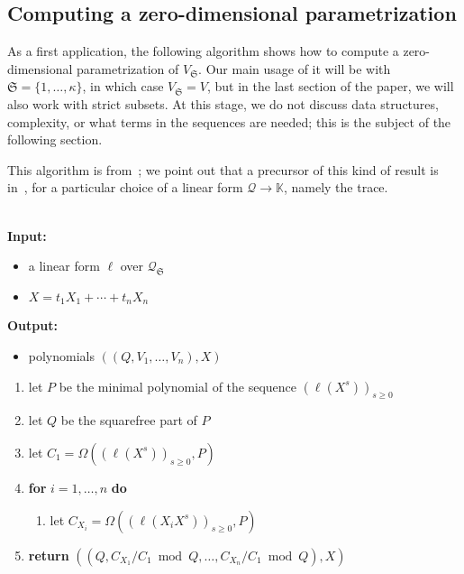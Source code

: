 \documentclass[12pt]{article}
\newcommand{\minpoly}{P}
\newcommand{\lf}{X}
\newcommand{\residueI}{\mathscr{Q}}
\newcommand{\sqfree}{Q}
\def\dg{\kappa}
\def\K{\mathbb{K}}
\def\K {\ensuremath{\mathbb{K}}}
\begin{document}

\subsection{Computing a zero-dimensional parametrization}  \label{ssec:abstractlago}

As a first application, the following algorithm shows how to compute a
zero-dimensional parametrization of $V_{\mathfrak{S}}$. Our main usage
of it will be with $\mathfrak{S}=\{1,\dots,\dg\}$, in which case
$V_{\mathfrak{S}}=V$, but in the last section of the paper, we will
also work with strict subsets. At this stage, we do not discuss data
structures, complexity, or what terms in the sequences are needed;
this is the subject of the following section.

This algorithm is from~\cite{BoSaSc03}; we point out that a precursor
of this kind of result is in~\cite{Rouillier99}, for a particular
choice of a linear form $\residueI\to \K$, namely the trace.


\begin{algorithm}[H]
  \caption{$\mathsf{Parametrization}(\ell,\lf)$}  ~\\
	  {\bf Input:} \vspace{-0.5em}
	  \begin{itemize}\setlength\itemsep{0em}
	  \item  a linear form $\ell$ over $\residueI_\mathfrak{S}$
	  \item $\lf=t_1 X_1 + \cdots + t_n X_n$
	  \end{itemize}
	      {\bf Output:}  \vspace{-0.5em}
              \begin{itemize}
              \item              polynomials $((\sqfree,V_1,\dots,V_n),\lf)$ 
              \end{itemize}
	      \begin{enumerate}\setlength\itemsep{0em}
	      \item let $\minpoly$ be the minimal polynomial of the sequence $(\ell(\lf^s))_{s \ge 0}$
	      \item let $\sqfree$ be the squarefree part of $\minpoly$
	      \item let $C_1 = \Omega((\ell(\lf^s))_{s\ge0} ,\minpoly)$
	      \item \textbf{for} $i=1,\dots,n$ \textbf{do}
		\begin{enumerate}
		\item let $C_{X_i} = \Omega((\ell(X_i \lf^s))_{s\ge0}, \minpoly)$ 
		\end{enumerate}
	      \item \textbf{return} $((\sqfree, C_{X_1}/ C_1 \bmod \sqfree, \dots, C_{X_n}/ C_{1} \bmod \sqfree),\lf)$
	      \end{enumerate}
	      \label{algo:para2}
\end{algorithm}
\end{document}
